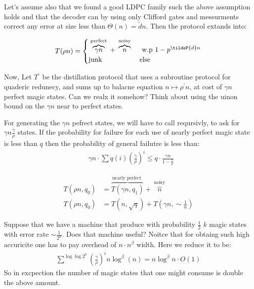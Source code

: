 \documentclass[manuscript,screen,review]{acmart}
\begin{document}
Let's assume also that we found a good LDPC family such the above assumption
holds and that the decoder can by using only Clifford gates and messurments
correct any error at size less than $\Theta(n)=\tilde{d}n$. Then the protocol
extands into:

\begin{equation*}
  \begin{split}
    T(\rho n) =
    \begin{cases}
      \overbrace{\gamma n}^{\text{ perfect }} +\overbrace{n}^{\text{ noisy }}
      & \text{ w.p }  1 - p^{\tildeP{d}n}  \\
      \text{junk} & \text{else}
    \end{cases}
  \end{split}
\end{equation*}

Now, Let $T^{\prime}$ be the distillation protocol that uses a subroutine
protocol for quaderic redunecy, and sums up to balacne equation $n \mapsto
\rho^{\prime} n$, at cost of $\gamma n$ perfect magic states. Can we realx it
somehow? Think about using the uinon bound on the $\gamma n$ near to perfect
states.

For generating the $\gamma n$ pefrect states, we will have to call reqursivly,
to ask for $\gamma n \frac{\gamma}{\rho}$ states. If the probability for
failure for each use of nearly perfect magic state is less than $q$ then the
probability of general failutre is less than:
\begin{equation*}
  \begin{split}
    & \gamma n \cdot \sum q(i) \left( \frac{\gamma}{\rho} \right)^{i} \le  q
    \cdot \frac{\gamma n }{ 1 - \frac{\gamma}{\rho}}
  \end{split}
\end{equation*}

\begin{equation*}
  \begin{split}
    T(\rho n, q_{0}) & = \overbrace{T(\gamma n, q_{1})}^{\text{nearly perfect
    }} +\overbrace{n}^{\text{ noisy }}   \\
    T(\rho n, q_{0}) &= T(n, \sqrt{q}) + T(\gamma n, \sim \frac{1}{n})
  \end{split}
\end{equation*}

Suppose that we have a machine that produce with probability $\frac{1}{2}$ $k$
magic states with error rate $\sim \frac{1}{2^{n}}$. Does that machine useful?
Noitce that for obtaing such high accuricite one has to pay overhead of
$n\cdot n^{\beta}$ width. Here we reduce it to be:
\begin{equation*}
  \begin{split}
    \sum^{\log \log 2^n}{ \left(\frac{\gamma}{\rho}\right)^{i} n  \log^{\beta}
    \left( n \right)} = n \log^{\beta} n \cdot O(1)
  \end{split}
\end{equation*}
So in excpection the number of magic states that one might consume is double
the above amount.
\end{document}
